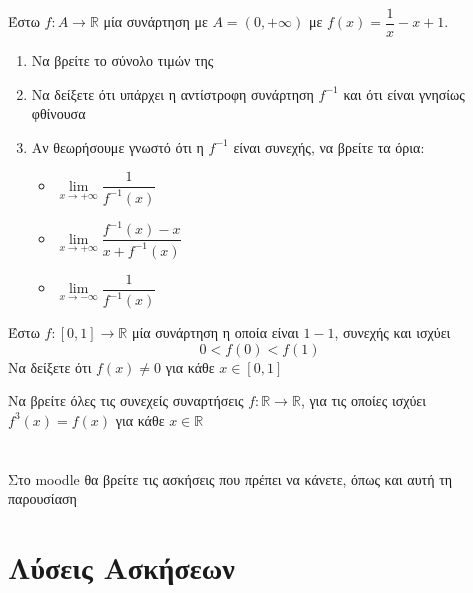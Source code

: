 \documentclass{presentation}
\begin{document}
\begin{askisi}
      Έστω $f:Α\to\mathbb{R}$ μία συνάρτηση με $Α=(0,+\infty)$ με $f(x)=\dfrac{1}{x}-x+1$.
      \begin{enumerate}
            \item<1-> Να βρείτε το σύνολο τιμών της
            \item<2-> Να δείξετε ότι υπάρχει η αντίστροφη συνάρτηση $f^{-1}$ και ότι είναι γνησίως φθίνουσα
            \item<3-> Αν θεωρήσουμε γνωστό ότι η $f^{-1}$ είναι συνεχής, να βρείτε τα όρια:
                  \begin{itemize}
                        \item $\lim\limits_{x \to +\infty}{ \dfrac{1}{f^{-1}(x)} }$
                        \item<4-> $\lim\limits_{x \to +\infty}{ \dfrac{f^{-1}(x)-x}{x+f^{-1}(x)} }$
                        \item<5-> $\lim\limits_{x \to -\infty}{ \dfrac{1}{f^{-1}(x)} }$
                  \end{itemize}
      \end{enumerate}
\end{askisi}

\begin{askisi}
      Έστω $f:[0,1]\to\mathbb{R}$ μία συνάρτηση η οποία είναι $1-1$, συνεχής και ισχύει
      $$0<f(0)<f(1)$$
      Να δείξετε ότι $f(x)\ne 0$ για κάθε $x\in [0,1]$
\end{askisi}

\begin{askisi}
      Να βρείτε όλες τις συνεχείς συναρτήσεις $f:\mathbb{R}\to\mathbb{R}$, για τις οποίες ισχύει $f^3(x)=f(x)$ για κάθε $x\in\mathbb{R}$
\end{askisi}

\section{}
\begin{frame}
      Στο moodle θα βρείτε τις ασκήσεις που πρέπει να κάνετε, όπως και αυτή τη παρουσίαση
\end{frame}

\appendix
\section{Λύσεις Ασκήσεων}
\begin{frame}
      \tableofcontents
\end{frame}
\end{document}
